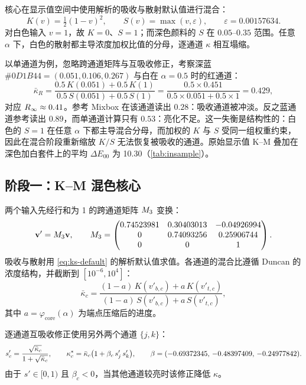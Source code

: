 核心在显示值空间中使用解析的吸收与散射默认值进行混合：
\begin{equation}
K(v)=\tfrac12(1-v)^{2},\qquad S(v)=\max(v,\varepsilon),\qquad \varepsilon=0.00157634.
\label{eq:ks-default}
\end{equation}
对白色输入 $v=1$，故 $K=0$、$S=1$；而深色颜料的 $S$ 在 $0.05$--$0.35$ 范围。任意 $\alpha$ 下，白色的散射都主导浓度加权比值的分母，逐通道 $\kappa$ 相互塌缩。

以单通道为例，忽略跨通道矩阵与互吸收修正，考察深蓝 $\#0D1B44=(0.051,0.106,0.267)$ 与白在 $\alpha=0.5$ 时的红通道：
\begin{equation}
\bar{\kappa}_{R}=
\frac{0.5\,K(0.051)+0.5\,K(1)}{0.5\,S(0.051)+0.5\,S(1)}
=\frac{0.5\times0.451}{0.5\times0.051+0.5\times1}=0.429,
\label{eq:defect}
\end{equation}
对应 $R_{\infty}\approx0.41$。参考 Mixbox 在该通道读出 $0.28$：吸收通道被冲淡。反之蓝通道参考读出 $0.89$，而单通道计算只有 $0.53$：亮化不足。这一失衡是结构性的：白色的 $S=1$ 在任意 $\alpha$ 下都主导混合分母，而加权的 $K$ 与 $S$ 受同一组权重约束，因此在混合阶段重新缩放 $K/S$ 无法恢复被吸收的通道。原始显示值 K--M 叠加在深色加白套件上的平均 $\Delta E_{00}$ 为 10.30（\cref{tab:insample}）。

\subsection{阶段一：K--M 混色核心}
\label{sec:core}

两个输入先经行和为 1 的跨通道矩阵 $M_{3}$ 变换：
\begin{equation}
\mathbf{v}'=M_{3}\mathbf{v},\qquad
M_{3}=
\begin{pmatrix}
0.74523981 & 0.30403013 & -0.04926994\\
0 & 0.74093256 & 0.25906744\\
0 & 0 & 1
\end{pmatrix}.
\label{eq:m3}
\end{equation}
吸收与散射用 \cref{eq:ks-default} 的解析默认值求值。各通道的混合比遵循 Duncan 的浓度结构，并截断到 $[10^{-6},10^{4}]$：
\begin{equation}
\bar{\kappa}_{c}=
\frac{(1-a)\,K(v'_{b,c})+a\,K(v'_{t,c})}
     {(1-a)\,S(v'_{b,c})+a\,S(v'_{t,c})},
\label{eq:kappa}
\end{equation}
其中 $a=\varphi_{\mathrm{core}}(\alpha)$ 为端点压缩后的进度。

逐通道互吸收修正使用另外两个通道 $\{j,k\}$：
\begin{equation}
s'_{c}=\frac{\sqrt{\bar{\kappa}_{c}}}{1+\sqrt{\bar{\kappa}_{c}}},\qquad
\kappa^{\ast}_{c}=\bar{\kappa}_{c}\bigl(1+\beta_{c}\,s'_{j}\,s'_{k}\bigr),\qquad
\beta=(-0.69372345,\,-0.48397409,\,-0.24977842).
\label{eq:beta}
\end{equation}
由于 $s'\in[0,1)$ 且 $\beta_{c}<0$，当其他通道较亮时该修正降低 $\kappa$。

